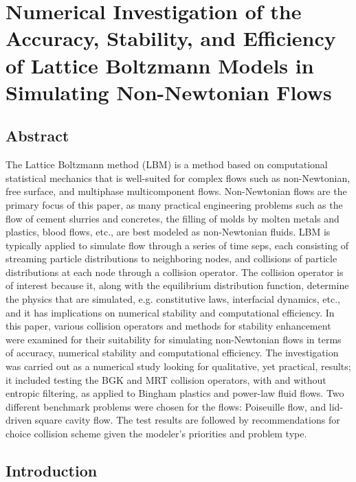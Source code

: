 \documentclass[pdftex,ms]{pittetd}
\begin{document}
\chapter{Numerical Investigation of the Accuracy, Stability, and Efficiency of Lattice Boltzmann Models in Simulating Non-Newtonian Flows} \label{chap:lbm-stability}

\section*{Abstract}

The Lattice Boltzmann method (LBM) is a method based on computational statistical mechanics that is well-suited for complex flows such as non-Newtonian, free surface, and multiphase multicomponent flows.
Non-Newtonian flows are the primary focus of this paper, as many practical engineering problems such as the flow of cement slurries and concretes, the filling of molds by molten metals and plastics, blood flows, etc., are best modeled as non-Newtonian fluids.
LBM is typically applied to simulate flow through a series of time seps, each consisting of streaming particle distributions to neighboring nodes, and collisions of particle distributions at each node through a collision operator.
The collision operator is of interest because it, along with the equilibrium distribution function, determine the physics that are simulated, e.g. constitutive laws, interfacial dynamics, etc., and it has implications on numerical stability and computational efficiency.
In this paper, various collision operators and methods for stability enhancement were examined for their suitability for simulating non-Newtonian flows in terms of accuracy, numerical stability and computational efficiency.
The investigation was carried out as a numerical study looking for qualitative, yet practical, results; it included testing the BGK and MRT collision operators, with and without entropic filtering, as applied to Bingham plastics and power-law fluid flows.
Two different benchmark problems were chosen for the flows: Poiseuille flow, and lid-driven square cavity flow.
The test results are followed by recommendations for choice collision scheme given the modeler's priorities and problem type.

\section{Introduction} %
\end{document}
